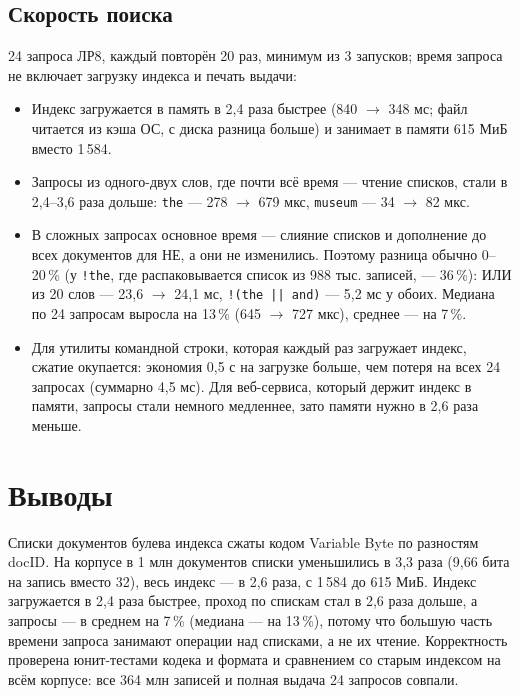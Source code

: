 \subsection{Скорость поиска}
24 запроса ЛР8, каждый повторён 20 раз, минимум из 3 запусков; время запроса не включает загрузку индекса и печать выдачи:
\begin{center}
\small

\end{center}
{\small

}
\begin{itemize}
    \item Индекс загружается в память в 2,4 раза быстрее (840 $\to$ 348 мс; файл читается из кэша ОС, с диска разница больше) и занимает в памяти 615 МиБ вместо 1\,584.
    \item Запросы из одного-двух слов, где почти всё время --- чтение списков, стали в 2,4--3,6 раза дольше: \texttt{the} --- 278 $\to$ 679 мкс, \texttt{museum} --- 34 $\to$ 82 мкс.
    \item В сложных запросах основное время --- слияние списков и дополнение до всех документов для НЕ, а они не изменились. Поэтому разница обычно 0--20\,\% (у \texttt{!the}, где распаковывается список из 988 тыс. записей, --- 36\,\%): ИЛИ из 20 слов --- 23,6 $\to$ 24,1 мс, \texttt{!(the || and)} --- 5,2 мс у обоих. Медиана по 24 запросам выросла на 13\,\% (645 $\to$ 727 мкс), среднее --- на 7\,\%.
    \item Для утилиты командной строки, которая каждый раз загружает индекс, сжатие окупается: экономия 0,5 с на загрузке больше, чем потеря на всех 24 запросах (суммарно 4,5 мс). Для веб-сервиса, который держит индекс в памяти, запросы стали немного медленнее, зато памяти нужно в 2,6 раза меньше.
\end{itemize}

\section{Выводы}
Списки документов булева индекса сжаты кодом Variable Byte по разностям docID. На корпусе в 1 млн документов списки уменьшились в 3,3 раза (9,66 бита на запись вместо 32), весь индекс --- в 2,6 раза, с 1\,584 до 615 МиБ. Индекс загружается в 2,4 раза быстрее, проход по спискам стал в 2,6 раза дольше, а запросы --- в среднем на 7\,\% (медиана --- на 13\,\%), потому что большую часть времени запроса занимают операции над списками, а не их чтение. Корректность проверена юнит-тестами кодека и формата и сравнением со старым индексом на всём корпусе: все 364 млн записей и полная выдача 24 запросов совпали.

